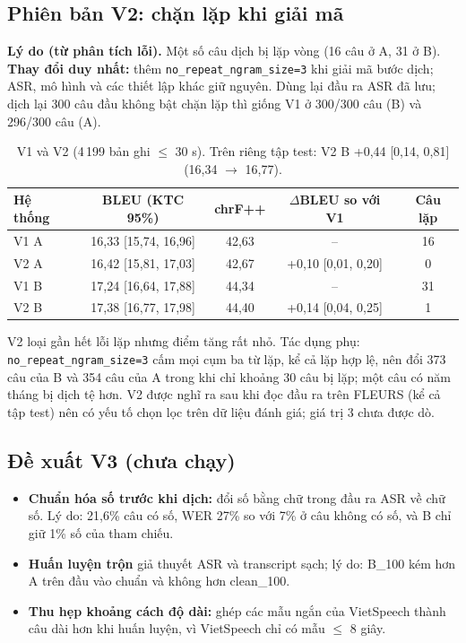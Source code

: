 \documentclass[12pt,a4paper]{article}
\newcommand{\ci}[2]{{\scriptsize[#1, #2]}}
\begin{document}
\subsection{Phiên bản V2: chặn lặp khi giải mã}
\textbf{Lý do (từ phân tích lỗi).} Một số câu dịch bị lặp vòng (16 câu ở A, 31 ở B). \textbf{Thay đổi duy nhất:} thêm \texttt{no\_repeat\_ngram\_size=3} khi giải mã bước dịch; ASR, mô hình và các thiết lập khác giữ nguyên. Dùng lại đầu ra ASR đã lưu; dịch lại 300 câu đầu không bật chặn lặp thì giống V1 ở 300/300 câu (B) và 296/300 câu (A).
\begin{table}[H]\centering\small
\begin{tabular}{lcccc}\toprule
Hệ thống & BLEU (KTC 95\%) & chrF++ & $\Delta$BLEU so với V1 & Câu lặp\\\midrule
V1 A & 16,33 \ci{15,74}{16,96} & 42,63 & -- & 16\\
V2 A & 16,42 \ci{15,81}{17,03} & 42,67 & +0,10 \ci{0,01}{0,20} & 0\\
V1 B & 17,24 \ci{16,64}{17,88} & 44,34 & -- & 31\\
V2 B & 17,38 \ci{16,77}{17,98} & 44,40 & +0,14 \ci{0,04}{0,25} & 1\\\bottomrule
\end{tabular}
\caption{V1 và V2 (4\,199 bản ghi $\le$ 30 s). Trên riêng tập test: V2 B +0,44 \ci{0,14}{0,81} (16,34 $\rightarrow$ 16,77).}
\end{table}
V2 loại gần hết lỗi lặp nhưng điểm tăng rất nhỏ. Tác dụng phụ: \texttt{no\_repeat\_ngram\_size=3} cấm mọi cụm ba từ lặp, kể cả lặp hợp lệ, nên đổi 373 câu của B và 354 câu của A trong khi chỉ khoảng 30 câu bị lặp; một câu có năm tháng bị dịch tệ hơn. V2 được nghĩ ra sau khi đọc đầu ra trên FLEURS (kể cả tập test) nên có yếu tố chọn lọc trên dữ liệu đánh giá; giá trị 3 chưa được dò.

\subsection{Đề xuất V3 (chưa chạy)}\label{sec:v3}
\begin{itemize}[nosep]
\item \textbf{Chuẩn hóa số trước khi dịch:} đổi số bằng chữ trong đầu ra ASR về chữ số. Lý do: 21,6\% câu có số, WER 27\% so với 7\% ở câu không có số, và B chỉ giữ 1\% số của tham chiếu.
\item \textbf{Huấn luyện trộn} giả thuyết ASR và transcript sạch; lý do: B\_100 kém hơn A trên đầu vào chuẩn và không hơn clean\_100.
\item \textbf{Thu hẹp khoảng cách độ dài:} ghép các mẫu ngắn của VietSpeech thành câu dài hơn khi huấn luyện, vì VietSpeech chỉ có mẫu $\le$ 8 giây.
\end{itemize}
\end{document}
